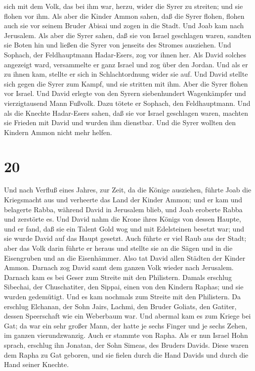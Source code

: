 sich mit dem Volk, das bei ihm war, herzu, wider die Syrer zu streiten;
und sie flohen vor ihm.  Als aber die Kinder Ammon sahen,
daß die Syrer flohen, flohen auch sie vor seinem Bruder Abisai und zogen
in die Stadt. Und Joab kam nach Jerusalem.  Als aber die
Syrer sahen, daß sie von Israel geschlagen waren, sandten sie Boten hin
und ließen die Syrer von jenseits des Stromes ausziehen. Und Sophach,
der Feldhauptmann Hadar-Esers, zog vor ihnen her.  Als
David solches angezeigt ward, versammelte er ganz Israel und zog über
den Jordan. Und als er zu ihnen kam, stellte er sich in Schlachtordnung
wider sie auf. Und David stellte sich gegen die Syrer zum Kampf, und sie
stritten mit ihm.  Aber die Syrer flohen vor Israel. Und
David erlegte von den Syrern siebenhundert Wagenkämpfer und
vierzigtausend Mann Fußvolk. Dazu tötete er Sophach, den Feldhauptmann.
 Und als die Knechte Hadar-Esers sahen, daß sie vor
Israel geschlagen waren, machten sie Frieden mit David und wurden ihm
dienstbar. Und die Syrer wollten den Kindern Ammon nicht mehr helfen.

\hypertarget{section-19}{%
\section{20}\label{section-19}}

 Und nach Verfluß eines Jahres, zur Zeit, da die Könige
ausziehen, führte Joab die Kriegsmacht aus und verheerte das Land der
Kinder Ammon; und er kam und belagerte Rabba, während David in Jerusalem
blieb, und Joab eroberte Rabba und zerstörte es.  Und
David nahm die Krone ihres Königs von dessen Haupte, und er fand, daß
sie ein Talent Gold wog und mit Edelsteinen besetzt war; und sie wurde
David auf das Haupt gesetzt. Auch führte er viel Raub aus der Stadt;
 aber das Volk darin führte er heraus und stellte sie an
die Sägen und in die Eisengruben und an die Eisenhämmer. Also tat David
allen Städten der Kinder Ammon. Darnach zog David samt dem ganzen Volk
wieder nach Jerusalem.  Darnach kam es bei Geser zum
Streite mit den Philistern. Damals erschlug Sibechai, der Chuschatiter,
den Sippai, einen von den Kindern Raphas; und sie wurden gedemütigt.
 Und es kam nochmals zum Streite mit den Philistern. Da
erschlug Elchanan, der Sohn Jairs, Lachmi, den Bruder Goliats, den
Gatiter, dessen Speerschaft wie ein Weberbaum war.  Und
abermal kam es zum Kriege bei Gat; da war ein sehr großer Mann, der
hatte je sechs Finger und je sechs Zehen, im ganzen vierundzwanzig. Auch
er stammte von Rapha.  Als er nun Israel Hohn sprach,
erschlug ihn Jonatan, der Sohn Simeas, des Bruders Davids.
 Diese waren dem Rapha zu Gat geboren, und sie fielen
durch die Hand Davids und durch die Hand seiner Knechte.


